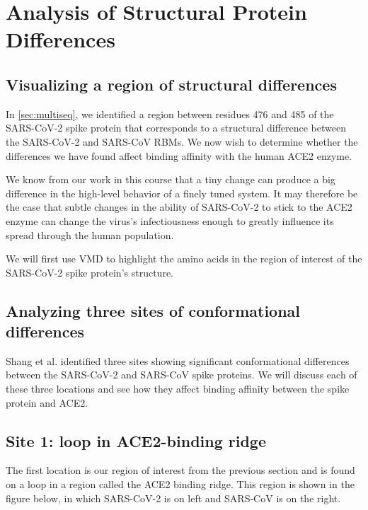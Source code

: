 {{\FloatBarrier
{}

\section{Analysis of Structural Protein Differences}
\label{sec:structural_differences}
\subsection{Visualizing a region of structural differences}

In \autoref{sec:multiseq}, we identified a region between residues 476 and 485 of the SARS-CoV-2 spike protein that corresponds to a structural difference between the SARS-CoV-2 and SARS-CoV RBMs. We now wish to determine whether the differences we have found affect binding affinity with the human ACE2 enzyme.

We know from our work in this course that a tiny change can produce a big difference in the high-level behavior of a finely tuned system. It may therefore be the case that subtle changes in the ability of SARS-CoV-2 to stick to the ACE2 enzyme can change the virus's infectiousness enough to greatly influence its spread through the human population.

We will first use VMD to highlight the amino acids in the region of interest of the SARS-CoV-2 spike protein's structure. 

\FloatBarrier
{}
\subsection{Analyzing three sites of conformational differences}

Shang et al. identified three sites showing significant conformational differences between the SARS-CoV-2 and SARS-CoV spike proteins. We will discuss each of these three locations and see how they affect binding affinity between the spike protein and ACE2.

\FloatBarrier
{}
\subsection{Site 1: loop in ACE2-binding ridge}

The first location is our region of interest from the previous section and is found on a loop in a region called the ACE2 binding ridge. This region is shown in the figure below, in which SARS-CoV-2 is on left and SARS-CoV is on the right.

}}
